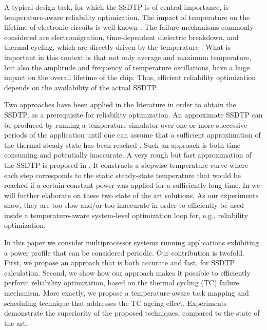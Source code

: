 
A typical design task, for which the SSDTP is of central importance, is temperature-aware reliability optimization. The impact of temperature on the lifetime of electronic circuits is well-known \cite{srinivasan2004, coskun2006, xiang2010, jedec2010}. The failure mechanisms commonly considered are electromigration, time-dependent dielectric breakdown, and thermal cycling, which are directly driven by the temperature \cite{jedec2010}. What is important in this context is that not only average and maximum temperature, but also the amplitude and frequency of temperature oscillations, have a huge impact on the overall lifetime of the chip. Thus, efficient reliability optimization depends on the availability of the actual SSDTP.

Two approaches have been applied in the literature in order to obtain the SSDTP, as a prerequisite for reliability optimization. An approximate SSDTP can be produced by running a temperature simulator over one or more successive periods of the application until one can assume that a sufficient approximation of the thermal steady state has been reached \cite{srinivasan2004}. Such an approach is both time consuming and potentially inaccurate. A very rough but fast approximation of the SSDTP is proposed in \cite{huang2009}. It constructs a stepwise temperature curve where each step corresponds to the static steady-state temperature that would be reached if a certain constant power was applied for a sufficiently long time. In  we will further elaborate on these two state of the art solutions. As our experiments show, they are too slow and/or too inaccurate in order to efficiently be used inside a temperature-aware system-level optimization loop for, e.g., reliability optimization.

In this paper we consider multiprocessor systems running applications exhibiting a power profile that can be considered periodic. Our contribution is twofold. First, we propose an approach that is both accurate and fast, for SSDTP calculation. Second, we show how our approach makes it possible to efficiently perform reliability optimization, based on the thermal cycling (TC) failure mechanism. More exactly, we propose a temperature-aware task mapping and scheduling technique that addresses the TC ageing effect. Experiments demonstrate the superiority of the proposed techniques, compared to the state of the art.


